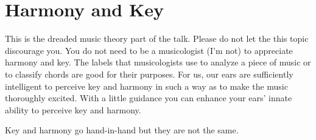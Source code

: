 \chapter{Harmony and Key}
This is the dreaded music theory part of the talk. Please do not let the this topic discourage you. You do not need to be a musicologist (I'm not) to appreciate harmony and key. The labels that musicologists use to analyze a piece of music or to classify chords are good for their purposes. For us, our ears are sufficiently intelligent to perceive key and harmony in such a way as to make the music thoroughly excited. With a little guidance you can enhance your ears' innate ability to perceive key and harmony.

Key and harmony go hand-in-hand but they are not the same.

